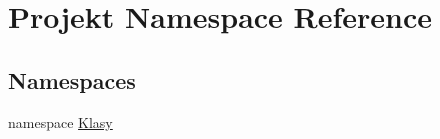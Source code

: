 \hypertarget{namespace_projekt}{}\section{Projekt Namespace Reference}
\label{namespace_projekt}
\subsection*{Namespaces}
\begin{DoxyCompactItemize}
\item 
namespace \mbox{\hyperlink{namespace_projekt_1_1_klasy}{Klasy}}
\end{DoxyCompactItemize}
